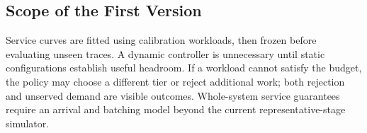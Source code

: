 \subsection{Scope of the First Version}
Service curves are fitted using calibration workloads, then frozen
before evaluating unseen traces. A dynamic controller is unnecessary
until static configurations establish useful headroom. If a workload
cannot satisfy the budget, the policy may choose a different tier or
reject additional work; both rejection and unserved demand are visible
outcomes. Whole-system service guarantees require an arrival and batching
model beyond the current representative-stage simulator.
